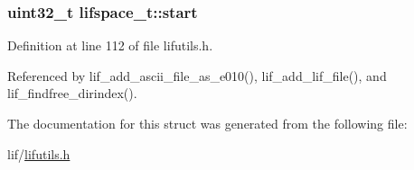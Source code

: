 \subsubsection[{\texorpdfstring{start}{start}}]{\setlength{\rightskip}{0pt plus 5cm}uint32\+\_\+t lifspace\+\_\+t\+::start}\hypertarget{structlifspace__t_a35702daf31460f978a09aef7a42c2671}{}\label{structlifspace__t_a35702daf31460f978a09aef7a42c2671}


Definition at line 112 of file lifutils.\+h.



Referenced by lif\+\_\+add\+\_\+ascii\+\_\+file\+\_\+as\+\_\+e010(), lif\+\_\+add\+\_\+lif\+\_\+file(), and lif\+\_\+findfree\+\_\+dirindex().



The documentation for this struct was generated from the following file\+:\begin{DoxyCompactItemize}
\item 
lif/\hyperlink{lifutils_8h}{lifutils.\+h}\end{DoxyCompactItemize}
